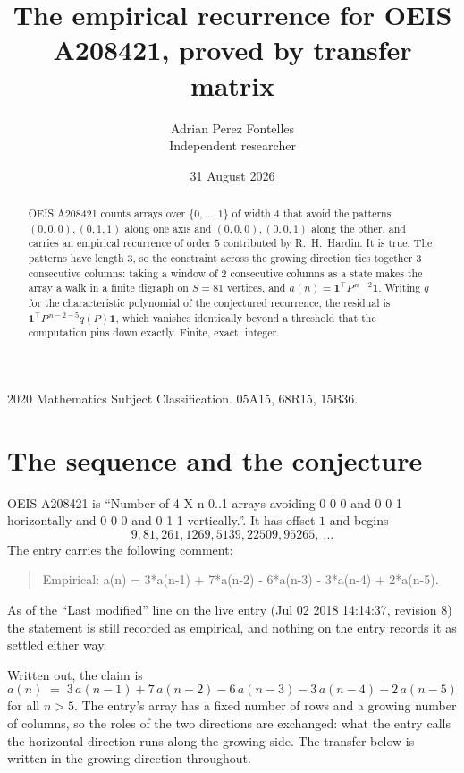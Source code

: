 \documentclass[11pt,a4paper]{article}
\title{The empirical recurrence for OEIS A208421, proved by transfer matrix}
\author{Adrian Perez Fontelles\\ \small Independent researcher}
\date{31 August 2026}
\theoremstyle{plain}
\theoremstyle{definition}
\begin{document}
\maketitle

\begin{abstract}
OEIS A208421 counts arrays over $\{0,\dots,1\}$ of width $4$ that avoid the patterns
$(0,0,0), (0,1,1)$ along one axis and $(0,0,0), (0,0,1)$ along the other, and carries an empirical recurrence of
order $5$ contributed by R.~H.~Hardin. It is true. The patterns have length $3$, so
the constraint across the growing direction ties together $3$ consecutive columns: taking a
window of $2$ consecutive columns as a state makes the array a walk in a finite digraph
on $S=81$ vertices, and $a(n)=\mathbf{1}^{\!\top}P^{\,n-2}\mathbf{1}$. Writing $q$
for the characteristic polynomial of the conjectured recurrence, the residual is
$\mathbf{1}^{\!\top}P^{\,n-2-5}q(P)\mathbf{1}$, which vanishes identically
beyond a threshold that the computation pins down exactly. Finite, exact, integer.
\end{abstract}

\noindent\small 2020 Mathematics Subject Classification. 05A15, 68R15, 15B36.\normalsize

\section{The sequence and the conjecture}

OEIS A208421 is ``Number of 4 X n 0..1 arrays avoiding 0 0 0 and 0 0 1 horizontally and 0 0 0 and 0 1 1 vertically.''. It has offset
$1$ and begins
\[
9, 81, 261, 1269, 5139, 22509, 95265,\ \dots
\]
The entry carries the following comment:
\begin{quote}\small
Empirical: a(n) = 3*a(n-1) + 7*a(n-2) - 6*a(n-3) - 3*a(n-4) + 2*a(n-5).
\end{quote}
As of the ``Last modified'' line on the live entry (Jul 02 2018 14:14:37, revision
8) the statement is still recorded as empirical, and nothing on the entry
records it as settled either way.

Written out, the claim is
\begin{equation}\label{eq:conj}
a(n)\;=\;3\,a(n-1) + 7\,a(n-2) - 6\,a(n-3) - 3\,a(n-4) + 2\,a(n-5)
\end{equation}
for all $n>5$. The entry's array has a fixed number of rows and a growing number of
columns, so the roles of the two directions are exchanged: what the entry calls the
horizontal direction runs along the growing side. The transfer below is written in the
growing direction throughout.
\end{document}
